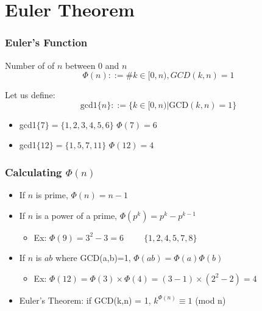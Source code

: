 \documentclass{beamer}
\begin{document}
\section{Euler Theorem}

\begin{frame}
  \frametitle{Euler's Function}

  {\larger

    Number of  of $n$ between
    0 and $n$
    \begin{equation*}
      \Phi(n) ::= \# k\in[0,n), GCD(k,n) = 1
    \end{equation*}

    \bigskip

    Let us define:
    \begin{equation*}
      \text{gcd1}\{n\} ::= \{ k \in [0,n)|\text{GCD}(k,n) = 1\}
    \end{equation*}

    \begin{itemize}
    \item gcd1$\{7\} = \{1,2,3,4,5,6\}$ \hfill $\Phi(7) = 6$
    \item gcd1$\{12\} = \{1,5,7,11\}$ \hfill $\Phi(12) = 4$
    \end{itemize}
  }
\end{frame}

\begin{frame}
  \frametitle{Calculating $\Phi(n)$}

  {\larger
    \begin{itemize}
    \item If $n$ is prime, $\Phi(n) = n-1$
    \item If $n$ is a power of a prime, $\Phi(p^k) = p^k - p^{k-1}$
      \begin{itemize}
      \item Ex: $\Phi(9) = 3^2 - 3 = 6 \hspace{1cm} \{1,2,4,5,7,8\}$
      \end{itemize}
      
    \item If $n$ is $ab$ where GCD(a,b)=1, $\Phi(ab) = \Phi(a)\Phi(b)$
      \begin{itemize}
      \item Ex: $\Phi(12) = \Phi(3) \times \Phi(4) = (3-1)\times (2^2 - 2) = 4$
      \end{itemize}

      \vfill

    \item \alert{Euler's Theorem:} if GCD(k,n) = 1,
      $k^{\Phi(n)}\equiv 1$ (mod n)
      
    \end{itemize}    
  }
\end{frame}
\end{document}
